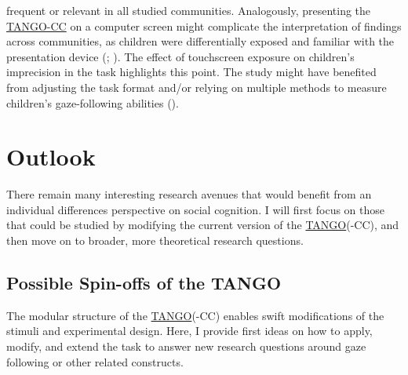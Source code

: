 \documentclass[
]{scrbook}
\begin{document}
frequent or relevant in all studied communities. Analogously, presenting the \hyperref[acronyms_TANGO-CC]{TANGO-CC} on a computer screen might complicate the interpretation of findings across communities, as children were differentially exposed and familiar with the presentation device (; ). The effect of touchscreen exposure on children's imprecision in the task highlights this point. The study might have benefited from adjusting the task format and/or relying on multiple methods to measure children's gaze-following abilities ().

\section{Outlook}\label{outlook}

There remain many interesting research avenues that would benefit from an individual differences perspective on social cognition. I will first focus on those that could be studied by modifying the current version of the \hyperref[acronyms_TANGO]{TANGO}(-CC), and then move on to broader, more theoretical research questions.

\subsection{Possible Spin-offs of the TANGO}\label{outlook-spinoffs}

The modular structure of the \hyperref[acronyms_TANGO]{TANGO}(-CC) enables swift modifications of the stimuli and experimental design. Here, I provide first ideas on how to apply, modify, and extend the task to answer new research questions around gaze following or other related constructs.
\end{document}
